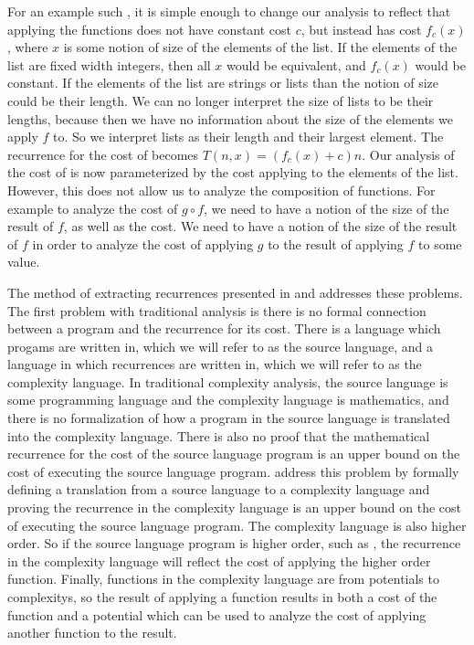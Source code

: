 For an example such , it is simple enough to change our analysis to
reflect that applying the functions  does not have constant cost $c$, but
instead has cost $f_c(x)$, where $x$ is some notion of size of the elements of
the list. If the elements of the list are fixed width integers, then all $x$
would be equivalent, and $f_c(x)$ would be constant. If the elements of the
list are strings or lists than the notion of size could be their
length. We can no longer interpret the size of lists to be their lengths,
because then we have no information about the size of the elements we apply $f$
to. So we interpret lists as their length and their largest element. The
recurrence for the cost of  becomes $T(n,x) = (f_c(x) + c)n$. Our
analysis of the cost of  is now parameterized by the cost applying 
to the elements of the list. However, this does not allow us to analyze the
composition of functions. For example to analyze the cost of $g \circ f$, we
need to have a notion of the size of the result of $f$, as well as the cost. We
need to have a notion of the size of the result of $f$ in order to analyze the
cost of applying $g$ to the result of applying $f$ to some value.

The method of extracting recurrences presented in \citet{Danner2013} and
\citet{Danner2015} addresses these problems. The first problem with traditional
analysis is there is no formal connection between a program and the recurrence
for its cost. There is a language which progams are written in, which we will
refer to as the source language, and a language in which recurrences are
written in, which we will refer to as the complexity language. In traditional
complexity analysis, the source language is some programming language and the
complexity language is mathematics, and there is no formalization of how a
program in the source language is translated into the complexity language.
There is also no proof that the mathematical recurrence for the cost of the
source language program is an upper bound on the cost of executing the source
language program. \citet{Danner2013} address this problem by formally defining
a translation from a source language to a complexity language and proving the
recurrence in the complexity language is an upper bound on the cost of
executing the source language program. The complexity language is also higher
order. So if the source language program is higher order, such as , the
recurrence in the complexity language will reflect the cost of applying the
higher order function. Finally, functions in the complexity language are from
potentials to complexitys, so the result of applying a function results in both
a cost of the function and a potential which can be used to analyze the cost of
applying another function to the result.

